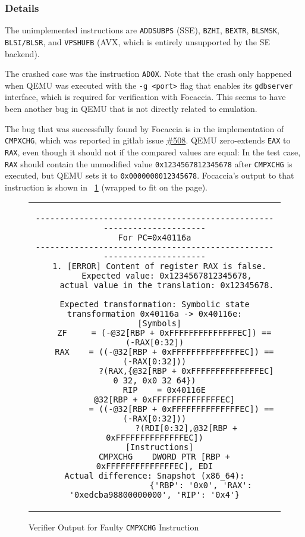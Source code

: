 \subsubsection{Details}

The unimplemented instructions are \texttt{ADDSUBPS} (SSE), \texttt{BZHI}, \texttt{BEXTR}, \texttt{BLSMSK},
\texttt{BLSI/BLSR}, and \texttt{VPSHUFB} (AVX, which is entirely unsupported by the SE backend).

The crashed case was the instruction \texttt{ADOX}. Note that the crash only happened when QEMU was executed with the
\texttt{-g <port>} flag that enables its \texttt{gdbserver} interface, which is required for verification with Focaccia.
This seems to have been another bug in QEMU that is not directly related to emulation.

The bug that was successfully found by Focaccia is in the implementation of \texttt{CMPXCHG}, which was reported in
gitlab issue \href{https://gitlab.com/qemu-project/qemu/-/issues/508}{\#508}. QEMU zero-extends \texttt{EAX} to
\texttt{RAX}, even though it should not if the compared values are equal: In the test case, \texttt{RAX} should contain
the unmodified value \texttt{0x1234567812345678} after \texttt{CMPXCHG} is executed, but QEMU sets it to
\texttt{0x0000000012345678}. Focaccia's output to that instruction is shown in \lstlistingname~\ref{fig:cmpxchg}
(wrapped to fit on the page).

\begin{figure}[htbp]
    \centering
    \begin{tabular}{c}
    \begin{lstlisting}
----------------------------------------------------------------------
For PC=0x40116a
----------------------------------------------------------------------
  1. [ERROR] Content of register RAX is false.
     Expected value: 0x1234567812345678,
     actual value in the translation: 0x12345678.

Expected transformation: Symbolic state transformation 0x40116a -> 0x40116e:
  [Symbols]
    ZF     = (-@32[RBP + 0xFFFFFFFFFFFFFFEC]) == (-RAX[0:32])
    RAX    = ((-@32[RBP + 0xFFFFFFFFFFFFFFEC]) == (-RAX[0:32]))
             ?(RAX,{@32[RBP + 0xFFFFFFFFFFFFFFEC] 0 32, 0x0 32 64})
    RIP    = 0x40116E
    @32[RBP + 0xFFFFFFFFFFFFFFEC]
           = ((-@32[RBP + 0xFFFFFFFFFFFFFFEC]) == (-RAX[0:32]))
             ?(RDI[0:32],@32[RBP + 0xFFFFFFFFFFFFFFEC])
  [Instructions]
    CMPXCHG    DWORD PTR [RBP + 0xFFFFFFFFFFFFFFEC], EDI
Actual difference: Snapshot (x86_64):
                   {'RBP': '0x0', 'RAX': '0xedcba98800000000', 'RIP': '0x4'}
    \end{lstlisting}
    \end{tabular}
    \caption{Verifier Output for Faulty \texttt{CMPXCHG} Instruction}\label{fig:cmpxchg}
\end{figure}

